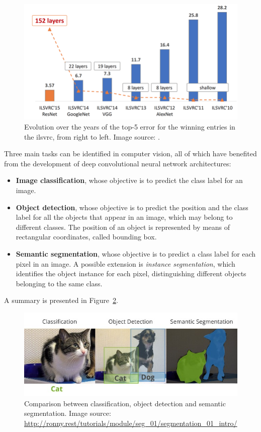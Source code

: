 \documentclass[%
    corpo=12pt,
    twoside,
    stile=classica,   
    tipotesi=magistrale,
    evenboxes,
    english,
	numerazioneromana,
]{toptesi}
\begin{document}
\begin{figure}[ht]
	\centering
	\includegraphics[width=.8\textwidth]{imgs/ILSVRC.png}
	\caption[Evolution of top-5 error for the winning entries in \gls{ilsvrc}]{Evolution over the years of the top-5 error for the winning entries in the \gls{ilsvrc}, from right to left\cite{russakovsky2015imagenet}. Image source: \cite{hanqing2020research}.
	\label{fig:imagenet}}
\end{figure}

\bigskip
Three main tasks can be identified in computer vision, all of which have benefited from the development of deep convolutional neural network architectures:

\begin{itemize}
	\item \textbf{Image classification}, whose objective is to predict the class label for an image.
	\item \textbf{Object detection}, whose objective is to predict the position and the class label for all the objects that appear in an image, which may belong to different classes. The position of an object is represented by means of rectangular coordinates, called bounding box.
	\item \textbf{Semantic segmentation}, whose objective is to predict a class label for each pixel in an image. A possible extension is \textit{instance segmentation}, which identifies the object instance for each pixel, distinguishing different objects belonging to the same class.
\end{itemize}

A summary is presented in Figure~\ref{fig:classdetseg}.

\begin{figure}
	\centering
	\includegraphics[width=.9\textwidth]{imgs/classification_detection_segmentaion.jpeg}
	\caption[Comparison between classification, object detection and semantic segmentation]{Comparison between classification, object detection and semantic segmentation. Image source: \url{http://ronny.rest/tutorials/module/seg_01/segmentation_01_intro/}}
	\label{fig:classdetseg}
\end{figure}
\end{document}
